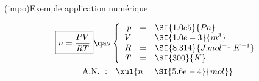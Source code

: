 \documentclass[a4paper, 10pt, garamond, oneside]{book}
\begin{document}
{\begin{tcb}(impo){Exemple application numérique}
	\vspace*{-10pt}
	\begin{minipage}{0.45\linewidth}
		\begin{gather*}
			\boxed{n = \frac{PV}{RT}}
			\qav
			\left\{
			\begin{array}{rcl}
				p & = & \SI{1.0e5}{Pa}                \\
				V & = & \SI{1.0e-3}{m^3}              \\
				R & = & \SI{8.314}{J.mol^{-1}.K^{-1}} \\
				T & = & \SI{300}{K}
			\end{array}
			\right.\\
			\mathrm{A.N.~:}\quad
			\xul{n = \SI{5.6e-4}{mol}}
		\end{gather*}
	\end{minipage}
	\hfill
\end{tcb}
\newpage
}

\setcounter{section}{0}
\end{document}
